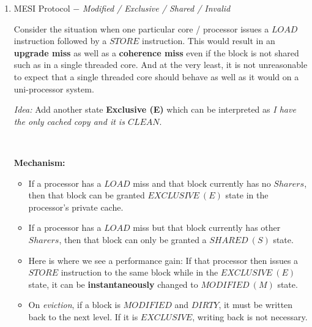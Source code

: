 \documentclass[12pt]{article}
\newenvironment{QandA}{\begin{enumerate}[label=\bfseries\arabic*.]\bfseries}
                      {\end{enumerate}}
\newenvironment{answered}{\par\quad\normalfont}{}
\begin{document}
\begin{QandA}
\begin{answered}
This is a particular pattern of cache miss where two or more processors share parts of the same block. They don't share the same \textit{bytes} within that block but just different parts of it. This will cause a \textit{ping-pong} behavior between the two processors resulting in poor performance. This is very difficult to diagnose but a solution is to pad each block so that no sub-block regions can be shared. 

\end{answered}

\ 

\item MESI Protocol $-$ \textit{Modified / Exclusive / Shared / Invalid}
\begin{answered}

Consider the situation when one particular core / processor issues a $LOAD$ instruction followed by a $STORE$ instruction. This would result in an \textbf{upgrade  miss} as well as a \textbf{coherence miss} even if the block is not shared such as in a single threaded core. And at the very least, it is not unreasonable to expect that a  single threaded core should behave as well as it would on a uni-processor system. 

\textit{Idea:} Add another state \textbf{Exclusive (E)} which can be interpreted as \textit{I have the only cached copy and it is $CLEAN$}.

\

\textbf{Mechanism:}
\begin{itemize}
    \item If a processor has a $LOAD$ miss and that block currently has no $Sharers$, then that block can be granted $EXCLUSIVE\ (E)$ state in the processor's private cache.
    \item If a processor has a $LOAD$ miss but that block currently has other $Sharers$, then that block can only be granted a $SHARED\ (S)$ state.
    \item Here is where we see a performance gain: If that processor then issues a $STORE$ instruction to the same block while in the $EXCLUSIVE\ (E)$ state, it can be \textbf{instantaneously} changed to $MODIFIED\ (M)$ state. 
    \item On \textit{eviction}, if a block is $MODIFIED$ and $DIRTY$, it must be written back to the next level. If it is $EXCLUSIVE$, writing back is not necessary.
\end{itemize}
\end{answered}

\newpage 


\end{QandA}
\end{document}
